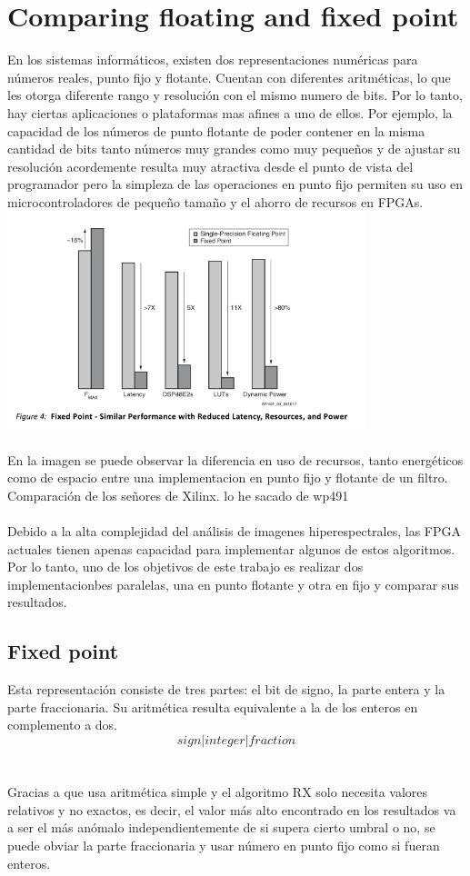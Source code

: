 \cleardoublepage
\chapter{Comparing floating and fixed point}
\label{makereference}

En los sistemas informáticos, existen dos representaciones numéricas para números reales, punto fijo y flotante. Cuentan con diferentes aritméticas, lo que les otorga diferente rango y resolución con el mismo numero de bits. Por lo tanto, hay ciertas aplicaciones o plataformas mas afines a uno de ellos. Por ejemplo, la capacidad de los números de punto flotante de poder contener en la misma cantidad de bits tanto números muy grandes como muy pequeños y de ajustar su resolución acordemente resulta muy atractiva desde el punto de vista del programador pero la simpleza de las operaciones en punto fijo permiten su uso en microcontroladores de pequeño tamaño y el ahorro de recursos en FPGAs.
\\
\includegraphics[height=2.5in]{figures/fp_vs_fp.png}
\\
\\
En la imagen se puede observar la diferencia en uso de recursos, tanto energéticos como de espacio entre una implementacion en punto fijo y flotante de un filtro.
Comparación de los señores de Xilinx. lo he sacado de wp491
\\
\\
Debido a la alta complejidad del análisis de imagenes hiperespectrales, las FPGA actuales tienen apenas capacidad para implementar algunos de estos algoritmos. Por lo tanto, uno de los objetivos de este trabajo es realizar dos implementacionbes paralelas, una en punto flotante y otra en fijo y comparar sus resultados.

\section{Fixed point}
Esta representación consiste de tres partes: el bit de signo, la parte entera y la parte fraccionaria. Su aritmética resulta equivalente a la de los enteros en complemento a dos.
\[sign | integer | fraction\]
\\
\\
Gracias a que usa aritmética simple y el algoritmo RX solo necesita valores relativos y no exactos, es decir, el valor más alto encontrado en los resultados va a ser el más anómalo independientemente de si supera cierto umbral o no, se puede obviar la parte fraccionaria y usar número en punto fijo como si fueran enteros.

